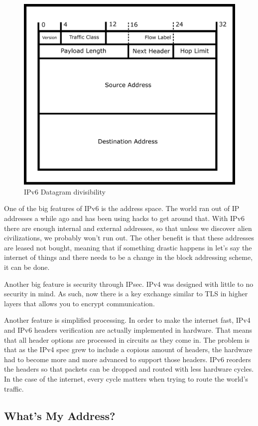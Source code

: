 \begin{figure}[H]
  \centering
\includegraphics[width=.8\textwidth]{networking/drawings/ipv6_datagram.png}
\caption{IPv6 Datagram divisibility}
\end{figure}

One of the big features of IPv6 is the address space.
The world ran out of IP addresses a while ago and has been using hacks to get around that.
With IPv6 there are enough internal and external addresses, so that unless we discover alien civilizations, we probably won't run out.
The other benefit is that these addresses are leased not bought, meaning that if something drastic happens in let's say the internet of things and there needs to be a change in the block addressing scheme, it can be done.

Another big feature is security through IPsec.
IPv4 was designed with little to no security in mind.
As such, now there is a key exchange similar to TLS in higher layers that allows you to encrypt communication.

Another feature is simplified processing.
In order to make the internet fast, IPv4 and IPv6 headers verification are actually implemented in hardware.
That means that all header options are processed in circuits as they come in.
The problem is that as the IPv4 spec grew to include a copious amount of headers, the hardware had to become more and more advanced to support those headers.
IPv6 reorders the headers so that packets can be dropped and routed with less hardware cycles.
In the case of the internet, every cycle matters when trying to route the world's traffic.

\subsection{What's My Address?}

